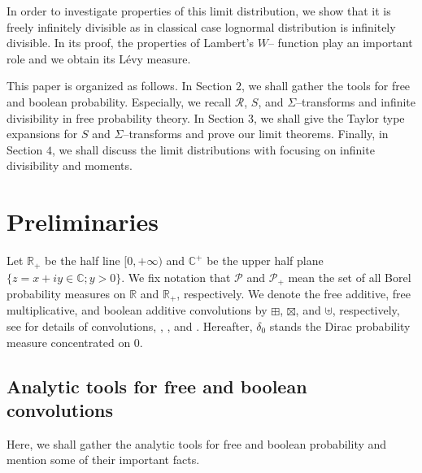 \documentclass[12pt]{amsart}
\theoremstyle{definition}
\numberwithin{equation}{section}
\begin{document}
In order to investigate properties of this limit distribution, we show that it is freely infinitely divisible
as in classical case lognormal distribution is infinitely divisible.
In its proof, the properties of Lambert's $W$-- function play an important role and we obtain its L\'evy measure.

This paper is organized as follows.
In Section $2$, we shall gather the tools for free and boolean probability.
Especially, we recall $\mathcal{R}$, $S$, and $\Sigma$--transforms and infinite divisibility in free probability theory.
In Section $3$, we shall give the Taylor type expansions for $S$ and $\Sigma$--transforms and prove our limit theorems.
Finally, in Section $4$, we shall discuss the limit distributions 
with focusing on infinite divisibility and moments.

\section{Preliminaries}
Let ${\mathbb{R}}_+$ be the half line $[0, +\infty)$ and ${\mathbb{C}}^{+}$ be the upper half plane $\{z=x+iy\in{\mathbb{C}};y>0\}$.
We fix notation that
$\mathcal{P}$ and $\mathcal{P}_+$ mean the set of all Borel probability measures
on ${\mathbb{R}}$ and ${\mathbb{R}}_+$, respectively.
We denote the free additive, free multiplicative, 
and boolean additive
convolutions 
by $\boxplus$, $\boxtimes$, and $\uplus$, respectively,
see for details of convolutions, \cite{SW97},
\cite{VoDyNi92}, and \cite{NiSp06}.
Hereafter, $\delta_{0}$ stands the Dirac probability measure concentrated on $0$.

\subsection{Analytic tools for free and boolean convolutions}

Here, we shall gather the analytic tools for free and boolean probability and mention some of their important facts.
\end{document}
